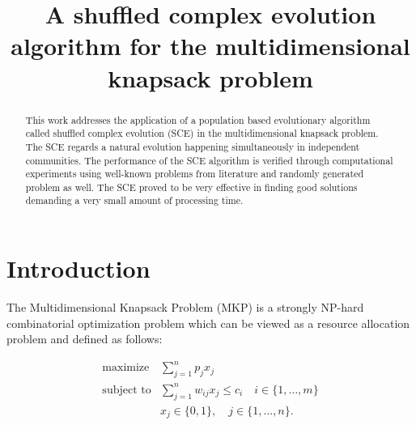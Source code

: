 \documentclass[10pt,conference, compsocconf]{IEEEtran}
\begin{document}
\title{A shuffled complex evolution algorithm for
the multidimensional knapsack problem}

\author{
\and
{}
}

\maketitle

\begin{abstract}
This work addresses the application of
a population based evolutionary algorithm
called shuffled complex evolution (SCE) in the multidimensional knapsack
problem.
The SCE regards a natural evolution happening simultaneously in independent communities.
The performance of the SCE algorithm is verified through computational experiments
using well-known problems from literature and randomly generated problem as well.
The SCE proved to be very effective in finding good solutions demanding a
very small amount of processing time.

\end{abstract}
\IEEEpeerreviewmaketitle

\section{Introduction}
\label{sec:intro}

The Multidimensional Knapsack Problem (MKP) is a strongly NP-hard combinatorial
optimization problem which can be viewed as a resource allocation problem and
defined as follows:

\begin{align*}
  \text{maximize} & \sum_{j=1}^n p_j x_j \\
  \text{subject to} & \sum_{j=1}^n w_{ij} x_j \leqslant c_i \quad i \in \{1, \ldots, m\}\\
   & x_j \in \{0, 1\}, \quad j \in \{1, \ldots, n\}.
\end{align*}
\end{document}
